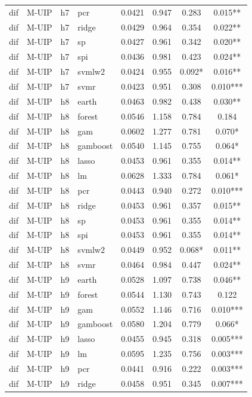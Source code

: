 \begin{ThreePartTable}
\begin{longtable}[t]{llclcccc}
dif & M-UIP & h7 & pcr & 0.0421 & 0.947 & 0.283 & 0.015**\\
dif & M-UIP & h7 & ridge & 0.0429 & 0.964 & 0.354 & 0.022**\\
dif & M-UIP & h7 & sp & 0.0427 & 0.961 & 0.342 & 0.020**\\
dif & M-UIP & h7 & spi & 0.0436 & 0.981 & 0.423 & 0.024**\\
dif & M-UIP & h7 & svmlw2 & 0.0424 & 0.955 & 0.092* & 0.016**\\
dif & M-UIP & h7 & svmr & 0.0423 & 0.951 & 0.308 & 0.010***\\
\addlinespace
dif & M-UIP & h8 & earth & 0.0463 & 0.982 & 0.438 & 0.030**\\
dif & M-UIP & h8 & forest & 0.0546 & 1.158 & 0.784 & 0.184\\
dif & M-UIP & h8 & gam & 0.0602 & 1.277 & 0.781 & 0.070*\\
dif & M-UIP & h8 & gamboost & 0.0540 & 1.145 & 0.755 & 0.064*\\
dif & M-UIP & h8 & lasso & 0.0453 & 0.961 & 0.355 & 0.014**\\
dif & M-UIP & h8 & lm & 0.0628 & 1.333 & 0.784 & 0.061*\\
dif & M-UIP & h8 & pcr & 0.0443 & 0.940 & 0.272 & 0.010***\\
dif & M-UIP & h8 & ridge & 0.0453 & 0.961 & 0.357 & 0.015**\\
dif & M-UIP & h8 & sp & 0.0453 & 0.961 & 0.355 & 0.014**\\
dif & M-UIP & h8 & spi & 0.0453 & 0.961 & 0.355 & 0.014**\\
dif & M-UIP & h8 & svmlw2 & 0.0449 & 0.952 & 0.068* & 0.011**\\
dif & M-UIP & h8 & svmr & 0.0464 & 0.984 & 0.447 & 0.024**\\
\addlinespace
dif & M-UIP & h9 & earth & 0.0528 & 1.097 & 0.738 & 0.046**\\
dif & M-UIP & h9 & forest & 0.0544 & 1.130 & 0.743 & 0.122\\
dif & M-UIP & h9 & gam & 0.0552 & 1.146 & 0.716 & 0.010***\\
dif & M-UIP & h9 & gamboost & 0.0580 & 1.204 & 0.779 & 0.066*\\
dif & M-UIP & h9 & lasso & 0.0455 & 0.945 & 0.318 & 0.005***\\
dif & M-UIP & h9 & lm & 0.0595 & 1.235 & 0.756 & 0.003***\\
dif & M-UIP & h9 & pcr & 0.0441 & 0.916 & 0.222 & 0.003***\\
dif & M-UIP & h9 & ridge & 0.0458 & 0.951 & 0.345 & 0.007***\\

\end{longtable}
\end{ThreePartTable}
